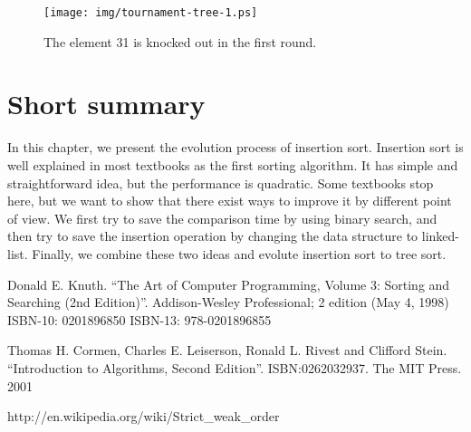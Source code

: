 \documentclass{article}
\begin{document}
\begin{figure}[htbp]
  \centering
  \texttt{[image: img/tournament-tree-1.ps]}
  \caption{The element 31 is knocked out in the first round.}
  \label{fig:tournament-tree-1}
\end{figure}

\section{Short summary} 
In this chapter, we present the evolution process of insertion sort. Insertion
sort is well explained in most textbooks as the first sorting algorithm.
It has simple and straightforward idea, but the performance is quadratic.
Some textbooks stop here, but we want to show that there exist ways to improve
it by different point of view. We first try to save the comparison time
by using binary search, and then try to save the insertion operation by
changing the data structure to linked-list. Finally, we combine these
two ideas and evolute insertion sort to tree sort.

\begin{thebibliography}{99}

Donald E. Knuth. ``The Art of Computer Programming, Volume 3: Sorting and Searching (2nd Edition)''. Addison-Wesley Professional; 2 edition (May 4, 1998) ISBN-10: 0201896850 ISBN-13: 978-0201896855

Thomas H. Cormen, Charles E. Leiserson, Ronald L. Rivest and Clifford Stein. 
``Introduction to Algorithms, Second Edition''. ISBN:0262032937. The MIT Press. 2001

http://en.wikipedia.org/wiki/Strict\_weak\_order

\end{thebibliography}

\ifx\wholebook\relax\else
\end{document}
